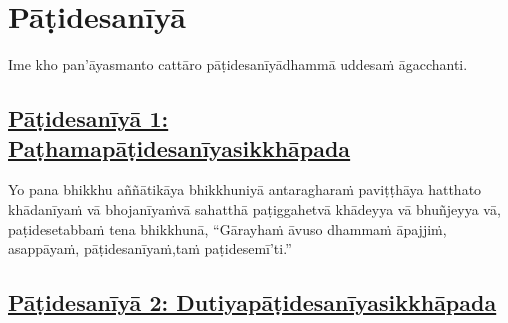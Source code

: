 
\section{Pāṭidesanīyā}
\label{pd}

\begin{intro}
	Ime kho pan'āyasmanto cattāro pāṭidesanīyā\makeatletter\hyperlink{endnote438-appendix}\makeatother \thinspace dhammā uddesaṁ āgacchanti.
\end{intro}

\setsubsecheadstyle{\subsubsectionFmtalt}
\subsection*{\hyperref[ack1]{Pāṭidesanīyā 1: Paṭhamapāṭidesanīyasikkhāpada}}
\label{pd1}

Yo pana bhikkhu aññātikāya bhikkhuniyā antaragharaṁ paviṭṭhāya hatthato khādanīyaṁ vā bhojanīyaṁ\makeatletter\hyperlink{endnote439-appendix}\makeatother \thinspace vā sahatthā paṭiggahetvā khādeyya vā bhuñjeyya vā, paṭidesetabbaṁ tena bhikkhunā, ``Gārayhaṁ āvuso dhammaṁ āpajjiṁ, asappāyaṁ, pāṭidesanīyaṁ,\makeatletter\hyperlink{endnote440-appendix}\makeatother \thinspace taṁ paṭidesemī'ti.''\makeatletter\hyperlink{endnote441-appendix}\makeatother \thinspace



\subsection*{\hyperref[ack2]{Pāṭidesanīyā 2: Dutiyapāṭidesanīyasikkhāpada}}
\label{pd2}

